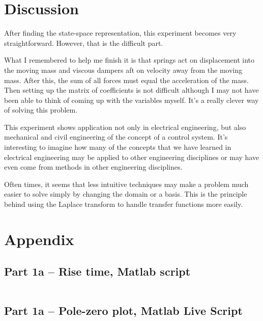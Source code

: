 \documentclass[12pt]{article}
\begin{document}
\section{Discussion}

After finding the state-space representation,
this experiment becomes very straightforward.
However, that is the difficult part.

What I remembered to help me finish it is that springs act on displacement into the moving mass and viscous dampers aft on velocity away from the moving mass.
After this, the sum of all forces must equal the acceleration of the mass.
Then setting up the matrix of coefficients is not difficult although I may not have been able to think of coming up with the variables myself.
It's a really clever way of solving this problem.

This experiment shows application not only in electrical engineering, but also mechanical and civil engineering of the concept of a control system.
It's interesting to imagine how many of the concepts that we have learned in electrical engineering may be applied to other engineering disciplines or may have even come from methods in other engineering disciplines.

Often times, it seems that less intuitive techniques may make a problem much easier to solve simply by changing the domain or a basis.
This is the principle behind using the Laplace transform to handle transfer functions more easily.

\newpage
\appendix
\section{Appendix}

\subsection{Part 1a -- Rise time, Matlab script}\label{sap:solving for .9cf and .1cf}
\inputminted{matlab}{src/part01a_rise_time.m}

\subsection{Part 1a -- Pole-zero plot, Matlab Live Script}\label{sap:pzplot}
\inputminted{matlab}{src/part01a_pzplot_mlx.m}
\end{document}
